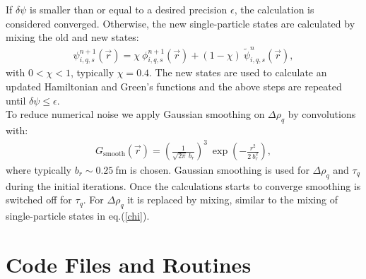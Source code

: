\documentclass[3p]{elsarticle}
\begin{document}
If $\delta \psi$ is smaller than or equal to a desired precision $\epsilon$, the calculation is considered converged. Otherwise, the new single-particle states are calculated by mixing the old and new states: 
\begin{align}
\psi_{i,q,s}^{n+1} (\vec{r}) = \chi \: \phi_{i,q,s}^{n+1} (\vec{r})+ (1 - \chi) \: \tilde{\psi}_{i,q,s}^{n} (\vec{r}), 
\label{chi}
\end{align} 
with $0 < \chi < 1$, typically $\chi = 0.4$. The new states are used to calculate an updated Hamiltonian and Green's functions and the above steps are repeated until $\delta \psi \leq \epsilon$.\\
To reduce numerical noise we apply Gaussian smoothing on $\Delta \rho_q$ by convolutions with:
\begin{align}
G_\mathrm{smooth} (\vec{r}) = \left( \frac{1}{\sqrt{2 \pi} \: b_r} \right)^{3} \: \exp\left(-\frac{r^2}{2 \: b_{r}^2}\right), 
\end{align}
where typically $b_{r} \sim 0.25\:$fm is chosen. Gaussian smoothing is used for $\Delta \rho_q$ and $\tau_q$ during the initial iterations. Once the calculations starts to converge smoothing is switched off for $\tau_q$. For $\Delta \rho_q$ it is replaced by mixing, similar to the mixing of single-particle states in eq.(\ref{chi}). 
\section{Code Files and Routines}
\end{document}
